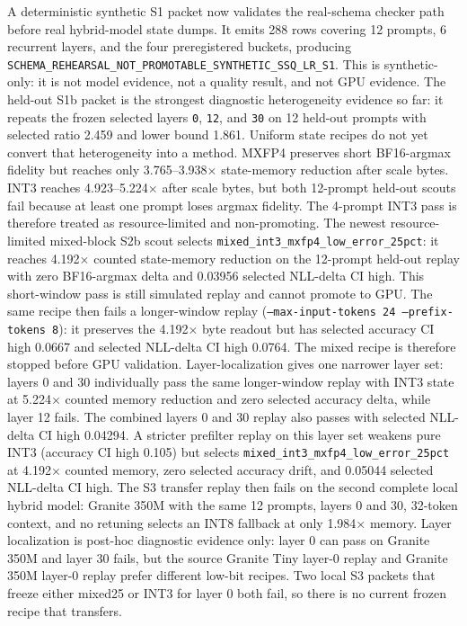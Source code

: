 \documentclass{article}
\begin{document}
A deterministic synthetic S1 packet now validates the real-schema checker path
before real hybrid-model state dumps. It emits 288 rows covering 12 prompts, 6
recurrent layers, and the four preregistered buckets, producing
\texttt{SCHEMA\_REHEARSAL\_NOT\_PROMOTABLE\_SYNTHETIC\_SSQ\_LR\_S1}. This is
synthetic-only: it is not model evidence, not a quality result, and not GPU
evidence.
The held-out S1b packet is the strongest diagnostic heterogeneity evidence so far: it repeats
the frozen selected layers \texttt{0}, \texttt{12}, and \texttt{30} on 12
held-out prompts with selected ratio 2.459 and lower bound 1.861. Uniform
state recipes do not yet convert that heterogeneity into a method. MXFP4 preserves short
BF16-argmax fidelity but reaches only 3.765--3.938$\times$ state-memory
reduction after scale bytes. INT3 reaches 4.923--5.224$\times$ after scale
bytes, but both 12-prompt held-out scouts fail because at least one prompt loses
argmax fidelity. The 4-prompt INT3 pass is therefore treated as resource-limited
and non-promoting.
The newest resource-limited mixed-block S2b scout selects
\texttt{mixed\_int3\_mxfp4\_low\_error\_25pct}: it reaches 4.192$\times$
counted state-memory reduction on the 12-prompt held-out replay with zero
BF16-argmax delta and 0.03956 selected NLL-delta CI high. This short-window
pass is still simulated replay and cannot promote to GPU.
The same recipe then fails a longer-window replay
(\texttt{--max-input-tokens 24 --prefix-tokens 8}): it preserves the
4.192$\times$ byte readout but has selected accuracy CI high 0.0667 and
selected NLL-delta CI high 0.0764. The mixed recipe is therefore stopped before
GPU validation.
Layer-localization gives one narrower layer set: layers 0 and 30 individually
pass the same longer-window replay with INT3 state at 5.224$\times$ counted
memory reduction and zero selected accuracy delta, while layer 12 fails. The
combined layers 0 and 30 replay also passes with selected NLL-delta CI high
0.04294. A stricter prefilter replay on this layer set weakens pure INT3
(accuracy CI high 0.105) but selects
\texttt{mixed\_int3\_mxfp4\_low\_error\_25pct} at 4.192$\times$ counted
memory, zero selected accuracy drift, and 0.05044 selected NLL-delta CI high.
The S3 transfer replay then fails on the second complete local hybrid model:
Granite 350M with the same 12 prompts, layers 0 and 30, 32-token context, and
no retuning selects an INT8 fallback at only 1.984$\times$ memory. Layer
localization is post-hoc diagnostic evidence only: layer 0 can pass on Granite
350M and layer 30 fails, but the source Granite Tiny layer-0 replay and Granite
350M layer-0 replay prefer different low-bit recipes. Two local S3 packets that
freeze either mixed25 or INT3 for layer 0 both fail, so there is no current
frozen recipe that transfers.
\end{document}
